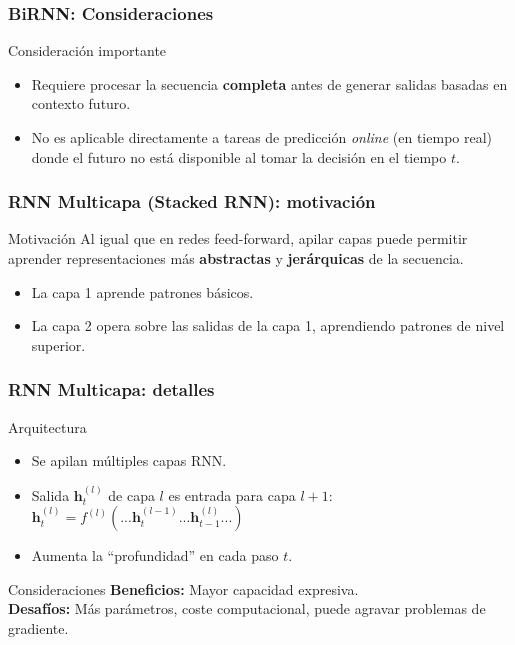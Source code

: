 \documentclass[handout]{beamer}
\newcommand{\vect}[1]{\mathbf{#1}} %
\begin{document}
\begin{frame}
    \frametitle{BiRNN: Consideraciones}
    \begin{alertblock}{Consideración importante}
        \begin{itemize}
            \item Requiere procesar la secuencia \textbf{completa} antes de generar salidas basadas en contexto futuro.
            \item No es aplicable directamente a tareas de predicción \textit{online} (en tiempo real) donde el futuro no está disponible al tomar la decisión en el tiempo $t$.
    \end{itemize}
    \end{alertblock}
\end{frame}

\begin{frame}
    \frametitle{RNN Multicapa (Stacked RNN): motivación}
     \begin{block}{Motivación}
        Al igual que en redes feed-forward, apilar capas puede permitir aprender representaciones más \textbf{abstractas} y \textbf{jerárquicas} de la secuencia.
        \begin{itemize}
            \item La capa 1 aprende patrones básicos.
            \item La capa 2 opera sobre las salidas de la capa 1, aprendiendo patrones de nivel superior.
        \end{itemize}
    \end{block}
\end{frame}

\begin{frame}
    \frametitle{RNN Multicapa: detalles}
        \begin{block}{Arquitectura}
            \begin{itemize}
                \item Se apilan múltiples capas RNN.
                \item Salida $\vect{h}_t^{(l)}$ de capa $l$ es entrada para capa $l+1$:
                $\vect{h}_t^{(l)} = f^{(l)}(... \vect{h}_t^{(l-1)} ... \vect{h}_{t-1}^{(l)} ...)$
                \item Aumenta la ``profundidad'' en cada paso $t$.
            \end{itemize}
        \end{block}
        \begin{block}{Consideraciones}
            \textbf{Beneficios:} Mayor capacidad expresiva. \\
            \textbf{Desafíos:} Más parámetros, coste computacional, puede agravar problemas de gradiente.
        \end{block}
\end{frame}
\end{document}
